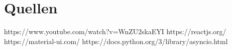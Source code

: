 \chapter{Quellen}

https://www.youtube.com/watch?v=WnZU2skaEYI
https://reactjs.org/
https://material-ui.com/
https://docs.python.org/3/library/asyncio.html